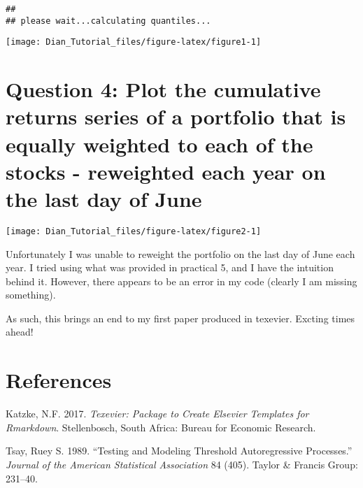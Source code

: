 \documentclass[11pt,preprint, authoryear]{elsarticle}
\let\origfigure\figure
\let\endorigfigure\endfigure
\renewenvironment{figure}[1][2] {
    \expandafter\origfigure\expandafter[H]
} {
    \endorigfigure
}
\numberwithin{equation}{section}
\numberwithin{figure}{section}
\numberwithin{table}{section}
\begin{document}
\begin{verbatim}
## 
## please wait...calculating quantiles...
\end{verbatim}

\begin{figure}[H]

{\centering \texttt{[image: Dian\_Tutorial\_files/figure-latex/figure1-1]} 

}

\caption{GARCH Plot \label{lit}}\label{fig:figure1}
\end{figure}

\section{\texorpdfstring{Question 4: Plot the cumulative returns series
of a portfolio that is equally weighted to each of the stocks -
reweighted each year on the last day of June
\label{Question 4}}{Question 4: Plot the cumulative returns series of a portfolio that is equally weighted to each of the stocks - reweighted each year on the last day of June }}\label{question-4-plot-the-cumulative-returns-series-of-a-portfolio-that-is-equally-weighted-to-each-of-the-stocks---reweighted-each-year-on-the-last-day-of-june}

\begin{figure}[H]

{\centering \texttt{[image: Dian\_Tutorial\_files/figure-latex/figure2-1]} 

}

\caption{Cumulative returns plot- equally weighted \label{lit}}\label{fig:figure2}
\end{figure}

Unfortunately I was unable to reweight the portfolio on the last day of
June each year. I tried using what was provided in practical 5, and I
have the intuition behind it. However, there appears to be an error in
my code (clearly I am missing something).

As such, this brings an end to my first paper produced in texevier.
Excting times ahead!

\newpage

\section*{References}\label{references}

\hypertarget{refs}{}
\hypertarget{ref-Texevier}{}
Katzke, N.F. 2017. \emph{Texevier: Package to Create Elsevier Templates
for Rmarkdown}. Stellenbosch, South Africa: Bureau for Economic
Research.

\hypertarget{ref-Tsay1989}{}
Tsay, Ruey S. 1989. ``Testing and Modeling Threshold Autoregressive
Processes.'' \emph{Journal of the American Statistical Association} 84
(405). Taylor \& Francis Group: 231--40.




\end{document}
